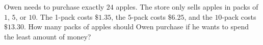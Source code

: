 Owen needs to purchase exactly $24$ apples. The store only sells apples in packs of $1$, $5$, or $10$. The 1-pack costs $\$1.35$, the $5$-pack costs $\$6.25$, and the $10$-pack costs $\$13.30$. How many packs of apples should Owen purchase if he wants to spend the least amount of money?
